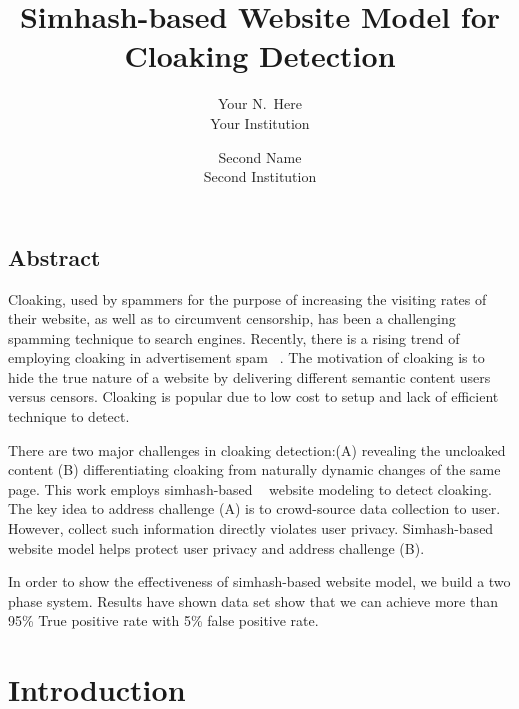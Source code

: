 \documentclass[letterpaper,twocolumn,10pt]{article}
\begin{document}
\date{}

\title{\Large \bf Simhash-based Website Model for Cloaking Detection}

\author{
{\rm Your N.\ Here}\\
Your Institution
\and
{\rm Second Name}\\
Second Institution
} %

\maketitle

\thispagestyle{empty}


\subsection*{Abstract}
Cloaking, used by spammers for the purpose of increasing the visiting rates of
their website, as well as to circumvent censorship, has been a challenging
spamming technique to search engines. Recently, there is a rising trend of employing cloaking in advertisement spam ~\cite{li2012knowing}.  The motivation of cloaking is to hide the true nature of a website by delivering different semantic content users versus censors.
Cloaking is popular due to low cost to setup and lack of efficient technique to detect.

There are two major challenges in cloaking detection:(A) revealing the uncloaked content (B) differentiating cloaking from naturally dynamic changes of the same page. This work employs simhash-based ~\cite{charikar2002similarity} website modeling to detect cloaking. The key idea to address challenge (A) is to crowd-source data collection to user. However, collect such information directly violates user privacy. Simhash-based website model helps protect user privacy and address challenge (B).

In order to show the effectiveness of simhash-based website model, we build a two phase system. Results have shown data set show that we can achieve more than 95\% True positive rate with 5\% false positive rate.


\section{Introduction}
\end{document}
